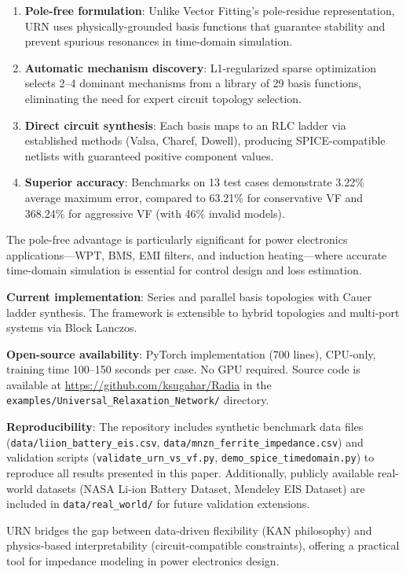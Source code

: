 \documentclass{ieeeaccess}
\begin{document}
\begin{enumerate}
\item \textbf{Pole-free formulation}: Unlike Vector Fitting's pole-residue representation, URN uses physically-grounded basis functions that guarantee stability and prevent spurious resonances in time-domain simulation.

\item \textbf{Automatic mechanism discovery}: L1-regularized sparse optimization selects 2--4 dominant mechanisms from a library of 29 basis functions, eliminating the need for expert circuit topology selection.

\item \textbf{Direct circuit synthesis}: Each basis maps to an RLC ladder via established methods (Valsa, Charef, Dowell), producing SPICE-compatible netlists with guaranteed positive component values.

\item \textbf{Superior accuracy}: Benchmarks on 13 test cases demonstrate 3.22\% average maximum error, compared to 63.21\% for conservative VF and 368.24\% for aggressive VF (with 46\% invalid models).
\end{enumerate}

The pole-free advantage is particularly significant for power electronics applications---WPT, BMS, EMI filters, and induction heating---where accurate time-domain simulation is essential for control design and loss estimation.

\textbf{Current implementation}: Series and parallel basis topologies with Cauer ladder synthesis. The framework is extensible to hybrid topologies and multi-port systems via Block Lanczos.

\textbf{Open-source availability}: PyTorch implementation (700 lines), CPU-only, training time 100--150 seconds per case. No GPU required. Source code is available at \url{https://github.com/ksugahar/Radia} in the \texttt{examples/Universal\_Relaxation\_Network/} directory.

\textbf{Reproducibility}: The repository includes synthetic benchmark data files (\texttt{data/liion\_battery\_eis.csv}, \texttt{data/mnzn\_ferrite\_impedance.csv}) and validation scripts (\texttt{validate\_urn\_vs\_vf.py}, \texttt{demo\_spice\_timedomain.py}) to reproduce all results presented in this paper. Additionally, publicly available real-world datasets (NASA Li-ion Battery Dataset, Mendeley EIS Dataset) are included in \texttt{data/real\_world/} for future validation extensions.

URN bridges the gap between data-driven flexibility (KAN philosophy) and physics-based interpretability (circuit-compatible constraints), offering a practical tool for impedance modeling in power electronics design.




\EOD
\end{document}
